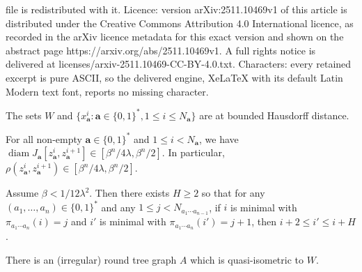 \documentclass[10pt,a4paper]{amsart}
\DeclareMathOperator{\diam}{diam}
\newcommand{\ba}{\mathbf{a}}
\begin{document}
file is redistributed with it. Licence: version arXiv:2511.10469v1 of this article is distributed under the Creative Commons Attribution 4.0 International licence, as recorded in the arXiv licence metadata for this exact version and shown on the abstract page https://arxiv.org/abs/2511.10469v1. A full rights notice is delivered at licenses/arxiv-2511.10469-CC-BY-4.0.txt. Characters: every retained excerpt is pure ASCII, so the delivered engine, XeLaTeX with its default Latin Modern text font, reports no missing character.
	\begin{lemma}\label{lem:cantorarcs0}
		The sets $W$ and $\{x_\ba^i: \ba \in \{0,1\}^*, 1 \leq i \leq N_{\ba}\}$ are at bounded Hausdorff distance.
	\end{lemma}

	\begin{lemma}\label{lem:cantorarcs1} For all non-empty $\ba \in \{0,1\}^*$ and $1 \leq i< N_\ba$, we have $\diam J_\ba[z_\ba^i, z_\ba^{i+1}] \in [\beta^n/4\lambda,\beta^n/2]$.  In particular, $\rho(z_\ba^i, z_\ba^{i+1}) \in [\beta^n/4\lambda,\beta^n/2]$.
	\end{lemma}

	\begin{lemma}\label{lem:cantorarcs3}
		Assume $\beta < 1/12 \lambda^2$.  Then there exists $H\geq 2$ so that for any $(a_1,\ldots,a_n)\in \{0,1\}^*$ and any $1 \leq j < N_{a_1\cdots a_{n-1}}$, if $i$ is minimal with $\pi_{a_1\cdots a_n}(i)=j$ and $i'$ is minimal with $\pi_{a_1\cdots a_n}(i')=j+1$, then $i+2 \leq i' \leq i+H$.
	\end{lemma}

	\begin{proposition}\label{prop:QI-round-tree-graph} There is an (irregular) round tree graph $A$ which is quasi-isometric to $W$.
    \end{proposition}
\end{document}
